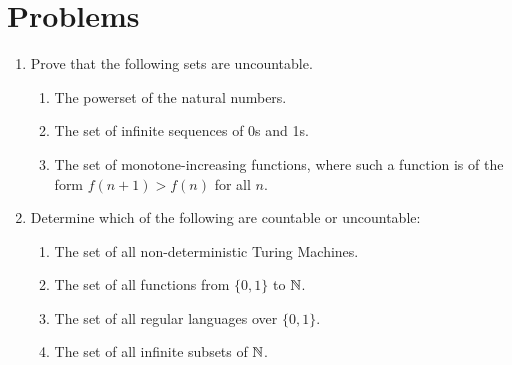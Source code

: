 \section{Problems}

\begin{enumerate}
	\item Prove that the following sets are uncountable.
	\begin{enumerate}
		\item The powerset of the natural numbers.
		\item The set of infinite sequences of 0s and 1s.
		\item The set of monotone-increasing functions, where such a function is of the form $f(n+1)>f(n)$ for all $n$.
	\end{enumerate}
	\item Determine which of the following are countable or uncountable:
	\begin{enumerate}
		\item The set of all non-deterministic Turing Machines.
		\item The set of all functions from $\{0, 1\}$ to $\mathbb{N}$.
		\item The set of all regular languages over $\{0, 1\}$.
		\item The set of all infinite subsets of $\mathbb{N}$.
	\end{enumerate}
\end{enumerate}
